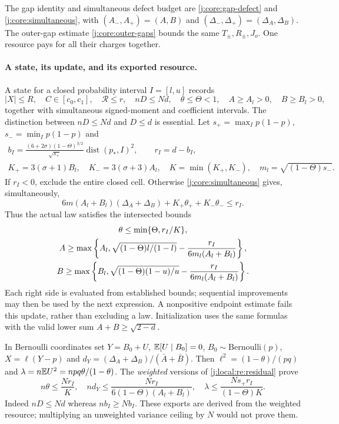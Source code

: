 The gap identity and simultaneous defect budget are
\eqref{j:core:gap-defect} and \eqref{j:core:simultaneous}, with
$(A_-,A_+)=(A,B)$ and $(\Delta_-,\Delta_+)=(\Delta_A,\Delta_B)$.
The outer-gap estimate \eqref{j:core:outer-gaps} bounds the same
$T_\pm,R_\pm,J_o$. One resource pays for all their charges together.

\paragraph{A state, its update, and its exported resource.}
A state for a closed probability interval $I=[l,u]$ records
\[
 |X|\le R,\quad C\in[c_0,c_1],\quad\mathcal R\le r,
 \quad nD\le Nd,\quad\theta\le\Theta<1,
 \quad A\ge A_l>0,\quad B\ge B_l>0,
\]
together with simultaneous signed-moment and coefficient intervals.
The distinction between $nD\le Nd$ and $D\le d$ is essential.
Let $s_+=\max_Ip(1-p)$, $s_-=\min_Ip(1-p)$ and
\begin{gather*}
 b_I=\frac{(6+2\sigma)(1-\Theta)^{3/2}}{\sqrt{s_+}}
                 \operatorname{dist}(p_*,I)^2,
 \qquad r_I=d-b_I,\\
 K_+=3(\sigma+1)B_l,\quad K_-=3(\sigma+3)A_l,
 \quad K=\min(K_+,K_-),\quad m_l=\sqrt{(1-\Theta)s_-}.
\end{gather*}
If $r_I<0$, exclude the entire closed cell. Otherwise \eqref{j:core:simultaneous}
gives, simultaneously,
\begin{equation}\label{j:local:re:residual}
 6m(A_l+B_l)(\Delta_A+\Delta_B)+K_+\theta_++K_-\theta_-\le r_I.
\end{equation}
Thus the actual law satisfies the intersected bounds
\begin{gather}
 \theta\le\min\{\Theta,r_I/K\},\notag\\
 A\ge\max\left\{A_l,\sqrt{(1-\Theta)l/(1-l)}-
                  \frac{r_I}{6m_l(A_l+B_l)}\right\},\notag\\
 B\ge\max\left\{B_l,\sqrt{(1-\Theta)(1-u)/u}-
                  \frac{r_I}{6m_l(A_l+B_l)}\right\}.\label{j:local:re:geometry}
\end{gather}
Each right side is evaluated from established bounds; sequential
improvements may then be used by the next expression. A nonpositive
endpoint estimate fails this update, rather than excluding a law.
Initialization uses the same formulas with the valid lower sum
$A+B\ge\sqrt{2-d}$.

In Bernoulli coordinates set $Y=B_0+U$, $\mathbb E[U\mid B_0]=0$,
$B_0\sim\mathrm{Bernoulli}(p)$, $X=\ell(Y-p)$ and
$d_Y=(\Delta_A+\Delta_B)/(\bar A+\bar B)$.
Then $\ell^2=(1-\theta)/(pq)$ and $\lambda=n\mathbb E U^2=npq\theta/(1-\theta)$.
The \emph{weighted} versions of \eqref{j:local:re:residual} prove
\begin{equation}\label{j:local:re:exports}
 n\theta\le\frac{Nr_I}{K},\quad
 nd_Y\le\frac{Nr_I}{6(1-\Theta)(A_l+B_l)},\quad
 \lambda\le\frac{Ns_+r_I}{(1-\Theta)K}.
\end{equation}
Indeed $nD\le Nd$ whereas $nb_I\ge Nb_I$.
These exports are derived from the weighted resource; multiplying an
unweighted variance ceiling by $N$ would not prove them.

